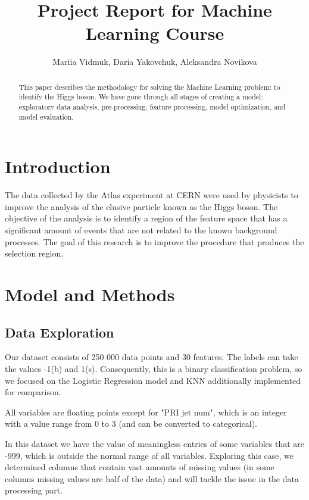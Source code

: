 \documentclass[10pt,conference,compsocconf]{IEEEtran}
\begin{document}
\title{Project Report for Machine Learning Course}

\author{
  Mariia Vidmuk, Daria Yakovchuk, Aleksandra Novikova\\
}

\maketitle

\begin{abstract}
  This paper describes the methodology for solving the Machine Learning problem: to identify the Higgs boson. We have gone through all stages of creating a model: exploratory data analysis, pre-processing, feature processing, model optimization, and model evaluation.

\end{abstract}

\section{Introduction}
The data collected by the Atlas experiment at CERN were used by physicists to improve the analysis of the elusive particle known as the Higgs boson. The objective of the analysis is to identify a region of the feature space that has a significant amount of events that are not related to the known background processes.
The goal of this research is to improve the procedure that produces the selection region.

\section{Model and Methods}
\subsection{Data Exploration}
Our dataset consists of 250 000 data points and 30 features. The labels can take the values -1(b) and 1(s). 
Consequently, this is a binary classification problem, so we focused on the Logistic Regression model and KNN additionally implemented for comparison.

All variables are floating points except for "PRI jet num", which is an integer with a value range from 0 to 3 (and can be converted to categorical).

In this dataset we have the value of meaningless entries of some variables that are -999, which is outside the normal range of all variables. Exploring this case, we determined columns that contain vast amounts of missing values (in some columns missing values are half of the data) and will tackle the issue in the data processing part.
\end{document}

